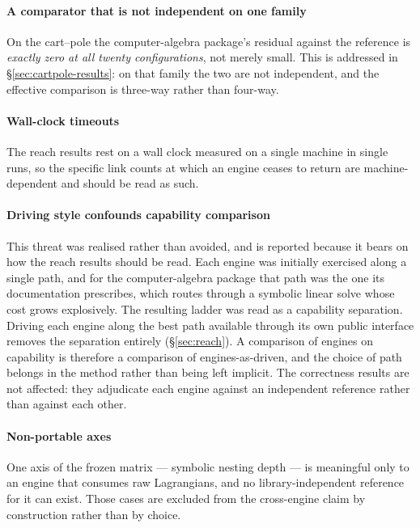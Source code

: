 \documentclass[review,12pt]{elsarticle}
\begin{document}
\paragraph{A comparator that is not independent on one family}
On the cart--pole the computer-algebra package's residual against the reference
is \emph{exactly zero at all twenty configurations}, not merely small. This is
addressed in \S\ref{sec:cartpole-results}: on that family the two are not
independent, and the effective comparison is three-way rather than four-way.

\paragraph{Wall-clock timeouts}
The reach results rest on a wall clock measured on a single machine in single
runs, so the specific link counts at which an engine ceases to return are
machine-dependent and should be read as such.

\paragraph{Driving style confounds capability comparison}
This threat was realised rather than avoided, and is reported because it bears
on how the reach results should be read. Each engine was initially exercised
along a single path, and for the computer-algebra package that path was the one
its documentation prescribes, which routes through a symbolic linear solve whose
cost grows explosively. The resulting ladder was read as a capability
separation. Driving each engine along the best path available through its own
public interface removes the separation entirely (\S\ref{sec:reach}). A comparison
of engines on capability is therefore a comparison of engines-as-driven, and
the choice of path belongs in the method rather than being left implicit. The
correctness results are not affected: they adjudicate each engine against an
independent reference rather than against each other.

\paragraph{Non-portable axes}
One axis of the frozen matrix --- symbolic nesting depth --- is meaningful only
to an engine that consumes raw Lagrangians, and no library-independent reference
for it can exist. Those cases are excluded from the cross-engine claim by
construction rather than by choice.
\end{document}
